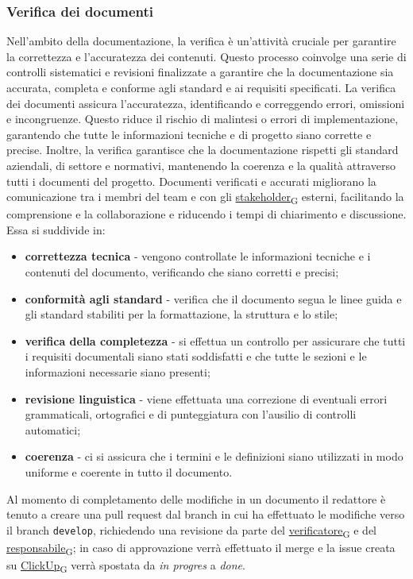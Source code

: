 \subsubsection{Verifica dei documenti} \label{verifica_dei_documenti}
Nell'ambito della documentazione, la verifica è un'attività cruciale per garantire la correttezza e l'accuratezza dei contenuti. Questo processo coinvolge una serie di controlli sistematici e revisioni finalizzate a garantire che la documentazione sia accurata, completa e conforme agli standard e ai requisiti specificati.
La verifica dei documenti assicura l'accuratezza, identificando e correggendo errori, omissioni e incongruenze. Questo riduce il rischio di malintesi o errori di implementazione, garantendo che tutte le informazioni tecniche e di progetto siano corrette e precise.
Inoltre, la verifica garantisce che la documentazione rispetti gli standard aziendali, di settore e normativi, mantenendo la coerenza e la qualità attraverso tutti i documenti del progetto. Documenti verificati e accurati migliorano la comunicazione tra i membri del team e con gli \href{https://7last.github.io/docs/pb/documentazione-interna/glossario\#stakeholder}{stakeholder\textsubscript{G}} esterni, facilitando la comprensione e la collaborazione e riducendo i tempi di chiarimento e discussione.
\newpage
Essa si suddivide in:
\begin{itemize}
	\item \textbf{correttezza tecnica} - vengono controllate le informazioni tecniche e i contenuti del documento, verificando che siano corretti e precisi;
	\item \textbf{conformità agli standard} - verifica che il documento segua le linee guida e gli standard stabiliti per la formattazione, la struttura e lo stile;
	\item \textbf{verifica della completezza} - si effettua un controllo per assicurare che tutti i requisiti documentali siano stati soddisfatti e che  tutte le sezioni e le informazioni necessarie siano presenti;
	\item \textbf{revisione linguistica} - viene effettuata una correzione di eventuali errori grammaticali, ortografici e di punteggiatura con l'ausilio di controlli automatici;
	\item \textbf{coerenza} - ci si assicura che i termini e le definizioni siano utilizzati in modo uniforme e coerente in tutto il documento.
\end{itemize}

Al momento di completamento delle modifiche in un documento il redattore è tenuto a creare una pull request dal branch in cui ha effettuato le modifiche verso il branch \texttt{develop}, richiedendo una revisione da parte del \href{https://7last.github.io/docs/pb/documentazione-interna/glossario\#verificatore}{verificatore\textsubscript{G}} e del \href{https://7last.github.io/docs/pb/documentazione-interna/glossario\#responsabile}{responsabile\textsubscript{G}}; in caso di approvazione verrà effettuato il merge e la issue creata su \href{https://7last.github.io/docs/pb/documentazione-interna/glossario\#clickup}{ClickUp\textsubscript{G}} verrà spostata da \textit{in progres} a \textit{done}.

